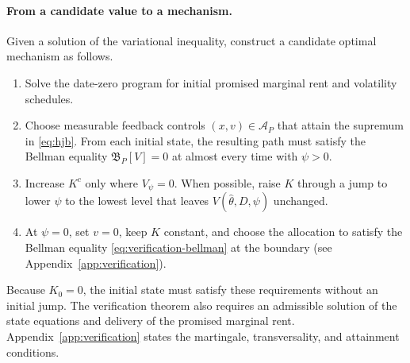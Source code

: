 \documentclass[12pt]{article}
\newcommand{\hth}{\hat\theta}
\begin{document}
\paragraph{From a candidate value to a mechanism.}
Given a solution of the variational inequality, construct a candidate optimal mechanism as follows.
\begin{enumerate}
\item Solve the date-zero program for initial promised marginal rent and volatility schedules. 
\item Choose measurable feedback controls
\((x,v)\in\mathcal A_P\) that attain the supremum in
\eqref{eq:hjb}. From each initial state, the resulting
path must satisfy the Bellman equality
\(\mathfrak B_P[V]=0\) at almost every time with \(\psi>0\).
\item Increase \(K^c\) only where \(V_\psi=0\). When possible, raise \(K\) through a jump to lower \(\psi\) to the lowest level that leaves
\(V(\hth,D,\psi)\) unchanged.
\item At \(\psi=0\), set \(v=0\), keep \(K\) constant, and
choose the allocation to satisfy the Bellman equality
\eqref{eq:verification-bellman} at the boundary
(see Appendix~\ref{app:verification}).
\end{enumerate}
Because \(K_0=0\), the initial state must satisfy these requirements
without an initial jump. The verification theorem also requires an
admissible solution of the state equations and delivery of the promised
marginal rent. Appendix~\ref{app:verification} states the martingale,
transversality, and attainment conditions.
\end{document}

